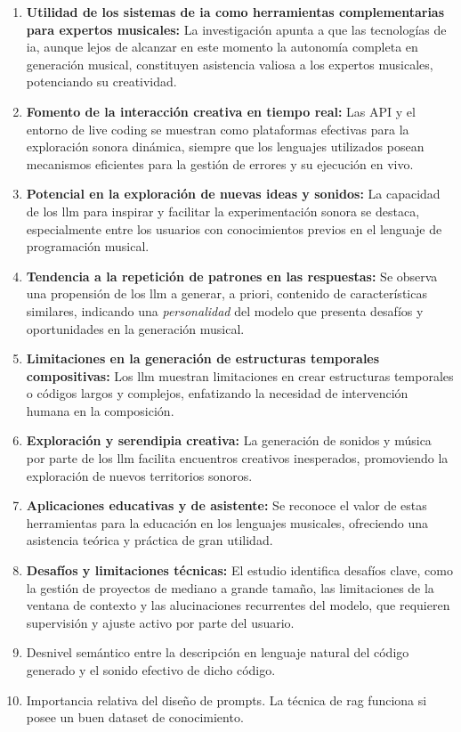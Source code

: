\begin{enumerate}
    \item \textbf{Utilidad de los sistemas de \gls{ia} como herramientas complementarias para expertos musicales:} La investigación apunta a que las tecnologías de \gls{ia}, aunque lejos de alcanzar en este momento la autonomía completa en generación musical, constituyen asistencia valiosa a los expertos musicales, potenciando su creatividad.
    \item \textbf{Fomento de la interacción creativa en tiempo real:} Las API y el entorno de live coding se muestran como plataformas efectivas para la exploración sonora dinámica, siempre que los lenguajes utilizados posean mecanismos eficientes para la gestión de errores y su ejecución en vivo.
    \item \textbf{Potencial en la exploración de nuevas ideas y sonidos:} La capacidad de los \gls{llm} para inspirar y facilitar la experimentación sonora se destaca, especialmente entre los usuarios con conocimientos previos en el lenguaje de programación musical.
    \item \textbf{Tendencia a la repetición de patrones en las respuestas:} Se observa una propensión de los \gls{llm} a generar, a priori, contenido de características similares, indicando una \emph{personalidad} del modelo que presenta desafíos y oportunidades en la generación musical.
    \item \textbf{Limitaciones en la generación de estructuras temporales compositivas:} Los \gls{llm} muestran limitaciones en crear estructuras temporales o códigos largos y complejos, enfatizando la necesidad de intervención humana en la composición.
    \item \textbf{Exploración y serendipia creativa:} La generación de sonidos y música por parte de los \gls{llm} facilita encuentros creativos inesperados, promoviendo la exploración de nuevos territorios sonoros.
    \item \textbf{Aplicaciones educativas y de asistente:} Se reconoce el valor de estas herramientas para la educación en los lenguajes musicales, ofreciendo una asistencia teórica y práctica de gran utilidad.
    \item \textbf{Desafíos y limitaciones técnicas:} El estudio identifica desafíos clave, como la gestión de proyectos de mediano a grande tamaño, las limitaciones de la ventana de contexto y las alucinaciones recurrentes del modelo, que requieren supervisión y ajuste activo por parte del usuario.
    


    \item Desnivel semántico entre la descripción en lenguaje natural del código generado y el sonido efectivo de dicho código.
    \item Importancia relativa del diseño de prompts. La técnica de \gls{rag} funciona si posee un buen dataset de conocimiento.
\end{enumerate}


